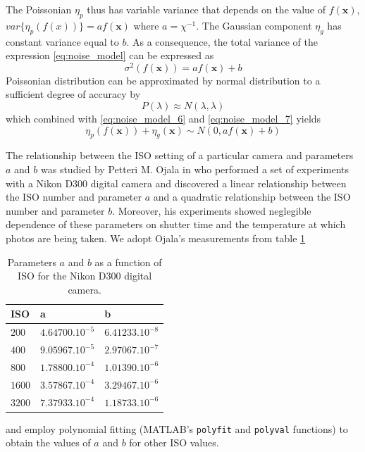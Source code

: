 \documentclass[12pt,notitlepage]{report}
\begin{document}
The Poissonian $\eta_p$ thus has variable variance that depends on the value of $f(\mathbf{x})$, $var\lbrace \eta_p (f(x) ) \rbrace = af(\mathbf{x})$ where $a=\chi^{-1}$. The Gaussian component $\eta_g$ has constant variance equal to $b$. As a consequence, the total variance of the expression \ref{eq:noise_model} can be expressed as
\begin{equation}
\label{eq:noise_model_7}
	\sigma^{2}(f(\mathbf{x})) = a f(\mathbf{x}) + b
\end{equation}
Poissonian distribution can be approximated by normal distribution to a sufficient degree of accuracy by
\begin{equation}
\label{eq:noise_model_8}
	P(\lambda) \approx N(\lambda, \lambda)
\end{equation}
which combined with \ref{eq:noise_model_6} and \ref{eq:noise_model_7} yields 
\begin{equation}
\label{eq:noise_model_9}
	\eta_p(f(\mathbf{x})) +  \eta_g(\mathbf{x}) \sim N(0, a f(\mathbf{x}) + b)
\end{equation}

The relationship between the ISO setting of a particular camera and parameters $a$ and $b$ was studied by Petteri M. Ojala in \cite{ojal08} who performed a set of experiments with a Nikon D300 digital camera and discovered a linear relationship between the ISO number and parameter $a$ and a quadratic relationship between the ISO number and parameter $b$. Moreover, his experiments showed neglegible dependence of these parameters on shutter time and the temperature at which photos are being taken. 
We adopt Ojala's measurements from table \ref{tab:ojal}
\begin{table}
  \centering
  \begin{tabular}{ |l | l | l | }
    \hline
	ISO & a & b \\ \hline
    $200$ & $4.64700.10^{-5}$& $6.41233.10^{-8}$ \\ \hline
    $400$ & $9.05967.10^{-5}$ & $2.97067.10^{-7}$ \\ \hline
    $800$ & $1.78800.10^{-4}$ & $1.01390.10^{-6}$ \\ \hline
    $1600$ & $3.57867.10^{-4}$ & $3.29467.10^{-6}$ \\ \hline
    $3200$ & $7.37933.10^{-4}$ & $1.18733.10^{-6}$ \\
    \hline
  \end{tabular}
  \caption{Parameters $a$ and $b$ as a function of ISO for the Nikon D300 digital camera.}
  \label{tab:ojal}
\end{table}
and employ polynomial fitting (MATLAB's \texttt{polyfit} and \texttt{polyval} functions) to obtain the values of $a$ and $b$ for other ISO values. 
\end{document}
